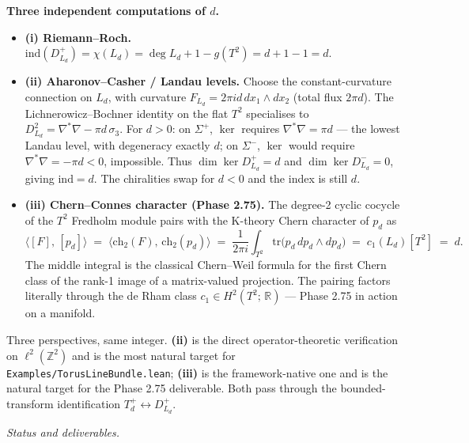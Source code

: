 \documentclass[
  11pt,
]{article}
\providecommand{\tightlist}{%
  \setlength{\itemsep}{0pt}\setlength{\parskip}{0pt}}
\begin{document}
\textbf{Three independent computations of \(d\).}

\begin{itemize}
\tightlist
\item
  \textbf{(i) Riemann--Roch.}
  \(\mathrm{ind}(D_{L_d}^+) = \chi(L_d) = \deg L_d + 1 - g(T^2) = d + 1 - 1 = d\).
\item
  \textbf{(ii) Aharonov--Casher / Landau levels.} Choose the
  constant-curvature connection on \(L_d\), with curvature
  \(F_{L_d} = 2\pi i d\,dx_1 \wedge dx_2\) (total flux \(2\pi d\)). The
  Lichnerowicz--Bochner identity on the flat \(T^2\) specialises to
  \(D_{L_d}^2 = \nabla^*\nabla - \pi d\,\sigma_3.\) For \(d > 0\): on
  \(\Sigma^+\), \(\ker\) requires \(\nabla^*\nabla = \pi d\) --- the
  lowest Landau level, with degeneracy exactly \(d\); on \(\Sigma^-\),
  \(\ker\) would require \(\nabla^*\nabla = -\pi d < 0\), impossible.
  Thus \(\dim\ker D_{L_d}^+ = d\) and \(\dim\ker D_{L_d}^- = 0\), giving
  \(\mathrm{ind} = d\). The chiralities swap for \(d < 0\) and the index
  is still \(d\).
\item
  \textbf{(iii) Chern--Connes character (Phase 2.75).} The degree-2
  cyclic cocycle of the \(T^2\) Fredholm module pairs with the K-theory
  Chern character of \(p_d\) as \[
  \bigl\langle [F],\,[p_d] \bigr\rangle \;=\; \bigl\langle \mathrm{ch}_2(F),\,\mathrm{ch}_2(p_d) \bigr\rangle
  \;=\; \frac{1}{2\pi i}\int_{T^2} \mathrm{tr}\bigl(p_d\,dp_d \wedge dp_d\bigr)
  \;=\; c_1(L_d)[T^2] \;=\; d.
  \] The middle integral is the classical Chern--Weil formula for the
  first Chern class of the rank-1 image of a matrix-valued projection.
  The pairing factors literally through the de Rham class
  \(c_1 \in H^2(T^2;\,\mathbb{R})\) --- Phase 2.75 in action on a
  manifold.
\end{itemize}

Three perspectives, same integer. \textbf{(ii)} is the direct
operator-theoretic verification on \(\ell^2(\mathbb{Z}^2)\) and is the
most natural target for \texttt{Examples/TorusLineBundle.lean};
\textbf{(iii)} is the framework-native one and is the natural target for
the Phase 2.75 deliverable. Both pass through the bounded-transform
identification \(T_d^+ \leftrightarrow D_{L_d}^+\).

\emph{Status and deliverables.}
\end{document}
